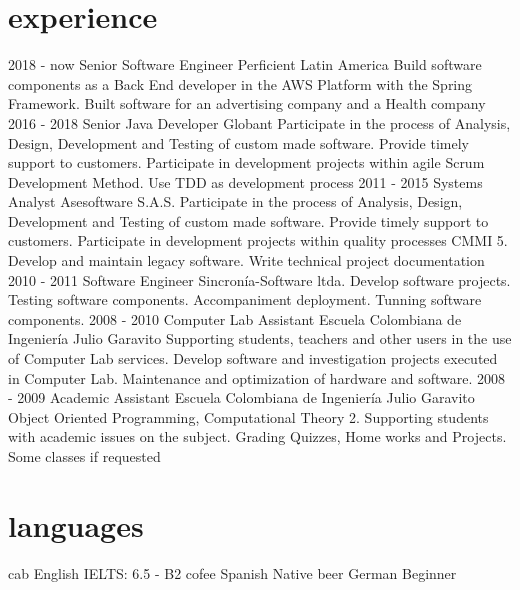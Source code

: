 \documentclass[icon]{twentysecondcv}
\begin{document}
\section{experience}
\begin{twenty}
\twentyitem
    {2018 - now}
    {Senior Software Engineer}
    {Perficient Latin America}
    {Build software components as a Back End developer in the AWS Platform with the Spring Framework. Built software for an advertising company and a Health company}
\twentyitem
    {2016 - 2018}
    {Senior Java Developer}
    {Globant}
    {Participate in the process of Analysis, Design, Development and Testing of custom made software. Provide timely support to customers. Participate in development projects within agile Scrum Development Method. Use TDD as development process}
  \twentyitem
    {2011 - 2015}
    {Systems Analyst}
    {Asesoftware S.A.S.}
    {Participate in the process of Analysis, Design, Development and Testing of custom made software. Provide timely support to customers. Participate in development projects within quality processes CMMI 5. Develop and maintain legacy software. Write technical project documentation}
  \twentyitem
    {2010 - 2011}
    {Software Engineer}
    {Sincron\'ia-Software ltda.}
    {Develop software projects. Testing software components. Accompaniment deployment. Tunning software components.}
\twentyitem
    {2008 - 2010}
    {Computer Lab Assistant}
    {Escuela Colombiana de Ingenier\'ia  Julio Garavito}
    {Supporting students, teachers and other users in the use of Computer Lab services. Develop software and investigation projects executed in Computer Lab. Maintenance and optimization of hardware and software.}
\twentyitem
    {2008 - 2009}
    {Academic Assistant}
    {Escuela Colombiana de Ingenier\'ia  Julio Garavito}
    {Object Oriented Programming, Computational Theory 2. Supporting students with academic issues on the subject. Grading Quizzes, Home works and Projects. Some classes if requested}

\end{twenty}

\section{languages}

\begin{twentyshorticon}
  \twentyitemshorticon
    {cab}
    {English}
    {IELTS: 6.5 - B2}
  \twentyitemshorticon
    {cofee}
    {Spanish}
    {Native}
  \twentyitemshorticon
    {beer}
    {German}
    {Beginner}
\end{twentyshorticon}


\end{document}
